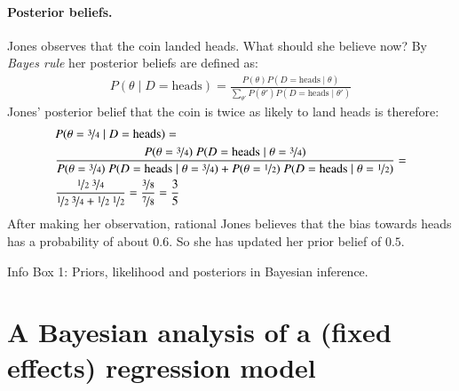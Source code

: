 \documentclass[nobib]{tufte-handout}
\begin{document}
\begin{InfoBox}[]
{\begin{minipage}{1.0\textwidth}
    \paragraph{Posterior beliefs.} Jones observes that the coin landed heads. What should she
    believe now? By \emph{Bayes rule} her posterior beliefs are defined as:
    \begin{align*}
      P(\theta \mid D = \text{heads}) = \frac{P(\theta) P(D = \text{heads} \mid \theta)}{\sum_{\theta'}P(\theta') P(D = \text{heads} \mid \theta')}
    \end{align*}
    Jones' posterior belief that the coin is twice as likely to land heads is therefore:
    \begin{align*}
      & P(\theta = \nicefrac{3}{4} \mid D = \text{heads}) =  \\
      & \frac{P(\theta = \nicefrac{3}{4}) \ P(D = \text{heads} \mid \theta = \nicefrac{3}{4})}{P(\theta = \nicefrac{3}{4}) \ P(D = \text{heads} \mid \theta = \nicefrac{3}{4}) + P(\theta = \nicefrac{1}{2}) \ P(D = \text{heads} \mid \theta = \nicefrac{1}{2})} = \\
      & \frac{\nicefrac{1}{2} \ \nicefrac{3}{4}}{\nicefrac{1}{2} \ \nicefrac{3}{4} + \nicefrac{1}{2} \ \nicefrac{1}{2}} = \frac{\nicefrac{3}{8}}{\nicefrac{7}{8}} = \frac{3}{5} 
    \end{align*}
    After making her observation, rational Jones believes that the bias towards heads has a
    probability of about $0.6$. So she has updated her prior belief of $0.5$.
    
  \end{minipage} \par
  } \par
  \begin{center}
    Info Box 1: Priors, likelihood and posteriors in Bayesian inference.
  \end{center}
\end{InfoBox}


\section{A Bayesian analysis of a (fixed effects) regression model}
\end{document}
